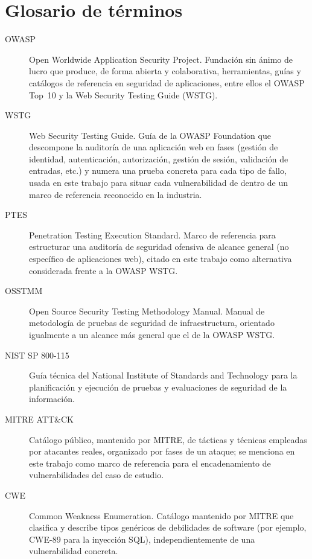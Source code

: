 \chapter*{Glosario de términos}

\begin{description}
\item[OWASP] Open Worldwide Application Security Project. Fundación sin
  ánimo de lucro que produce, de forma abierta y colaborativa, herramientas,
  guías y catálogos de referencia en seguridad de aplicaciones, entre ellos
  el OWASP Top~10 y la Web Security Testing Guide (WSTG).

\item[WSTG] Web Security Testing Guide. Guía de la OWASP Foundation que
  descompone la auditoría de una aplicación web en fases (gestión de
  identidad, autenticación, autorización, gestión de sesión, validación de
  entradas, etc.) y numera una prueba concreta para cada tipo de fallo,
  usada en este trabajo para situar cada vulnerabilidad de \breachlab
  dentro de un marco de referencia reconocido en la industria.

\item[PTES] Penetration Testing Execution Standard. Marco de referencia para
  estructurar una auditoría de seguridad ofensiva de alcance general (no
  específico de aplicaciones web), citado en este trabajo como alternativa
  considerada frente a la OWASP WSTG.

\item[OSSTMM] Open Source Security Testing Methodology Manual. Manual de
  metodología de pruebas de seguridad de infraestructura, orientado
  igualmente a un alcance más general que el de la OWASP WSTG.

\item[NIST SP 800-115] Guía técnica del National Institute of Standards and
  Technology para la planificación y ejecución de pruebas y evaluaciones de
  seguridad de la información.

\item[MITRE ATT\&CK] Catálogo público, mantenido por MITRE, de tácticas y
  técnicas empleadas por atacantes reales, organizado por fases de un
  ataque; se menciona en este trabajo como marco de referencia para el
  encadenamiento de vulnerabilidades del caso de estudio.

\item[CWE] Common Weakness Enumeration. Catálogo mantenido por MITRE que
  clasifica y describe tipos genéricos de debilidades de software (por
  ejemplo, CWE-89 para la inyección SQL), independientemente de una
  vulnerabilidad concreta.


\end{description}
